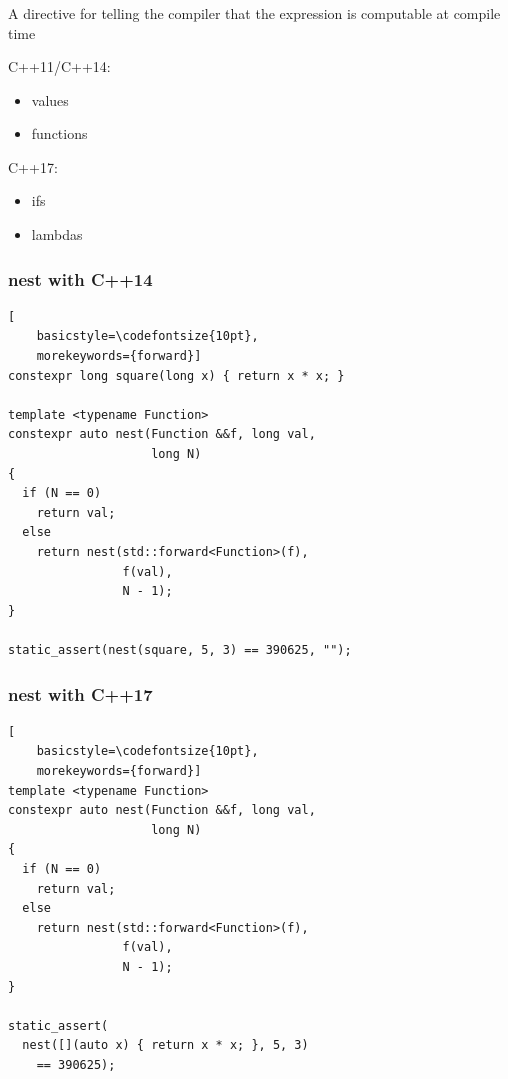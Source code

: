 \documentclass[14pt]{beamer}
\begin{document}
\begin{frame}
  \frametitle{}

  A directive for telling the compiler that the expression is computable at
  compile time

  \vspace{.5cm}
  C++11/C++14:
  
  \begin{itemize}
    \item {} values
    \item {} functions
  \end{itemize}

  \vspace{.5cm}
  C++17:
  
  \begin{itemize}
    \item {} ifs
    \item {} lambdas
  \end{itemize}


\end{frame}

\begin{frame}[fragile]
  \frametitle{nest with  C++14}

  \begin{lstlisting}[
    basicstyle=\codefontsize{10pt},
    morekeywords={forward}]
constexpr long square(long x) { return x * x; }

template <typename Function>
constexpr auto nest(Function &&f, long val,
                    long N)
{
  if (N == 0)
    return val;
  else
    return nest(std::forward<Function>(f),
                f(val),
                N - 1);
}

static_assert(nest(square, 5, 3) == 390625, "");
  \end{lstlisting}
  
\end{frame}

\begin{frame}[fragile]
  \frametitle{nest with  C++17}

  \begin{lstlisting}[
    basicstyle=\codefontsize{10pt},
    morekeywords={forward}]
template <typename Function>
constexpr auto nest(Function &&f, long val,
                    long N)
{
  if (N == 0)
    return val;
  else
    return nest(std::forward<Function>(f),
                f(val),
                N - 1);
}

static_assert(
  nest([](auto x) { return x * x; }, 5, 3)
    == 390625);
  \end{lstlisting}
  
\end{frame}
\end{document}
